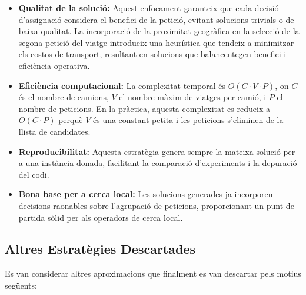 \begin{itemize}
    \item \textbf{Qualitat de la solució:} Aquest enfocament garanteix que cada decisió d'assignació considera el benefici de la petició, evitant solucions trivials o de baixa qualitat. La incorporació de la proximitat geogràfica en la selecció de la segona petició del viatge introdueix una heurística que tendeix a minimitzar els costos de transport, resultant en solucions que balancentegen benefici i eficiència operativa.
    
    \item \textbf{Eficiència computacional:} La complexitat temporal és $O(C \cdot V \cdot P)$, on $C$ és el nombre de camions, $V$ el nombre màxim de viatges per camió, i $P$ el nombre de peticions. En la pràctica, aquesta complexitat es redueix a $O(C \cdot P)$ perquè $V$ és una constant petita i les peticions s'eliminen de la llista de candidates.
    
    \item \textbf{Reproducibilitat:} Aquesta estratègia genera sempre la mateixa solució per a una instància donada, facilitant la comparació d'experiments i la depuració del codi.
    
    \item \textbf{Bona base per a cerca local:} Les solucions generades ja incorporen decisions raonables sobre l'agrupació de peticions, proporcionant un punt de partida sòlid per als operadors de cerca local.
\end{itemize}

\subsection{Altres Estratègies Descartades}

Es van considerar altres aproximacions que finalment es van descartar pels motius següents:

